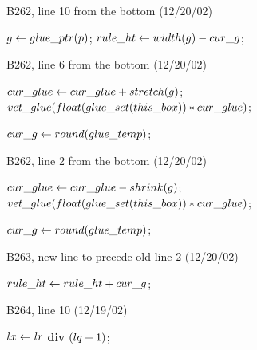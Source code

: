 {\bugonpage B262, line 10 from the bottom (12/20/02)

\ninepoint\noindent
{} $g\gets\\{glue\_ptr}(p)$;
  $\\{rule\_ht}\gets\\{width}(g)-\\{cur\_g}$;

\bugonpage B262, line 6 from the bottom (12/20/02)

\ninepoint\noindent
\qquad{} $\\{cur\_glue}\gets\\{cur\_glue}+\\{stretch}(g)$;
 $\\{vet\_glue}(\\{float}(\\{glue\_set}(\\{this\_box}))*\\{cur\_glue})$;\par
\noindent\qquad\qquad$\\{cur\_g}\gets\\{round}(\\{glue\_temp})$;

\bugonpage B262, line 2 from the bottom (12/20/02)

\ninepoint\noindent
\qquad{} $\\{cur\_glue}\gets\\{cur\_glue}-\\{shrink}(g)$;
 $\\{vet\_glue}(\\{float}(\\{glue\_set}(\\{this\_box}))*\\{cur\_glue})$;\par
\noindent\qquad\qquad$\\{cur\_g}\gets\\{round}(\\{glue\_temp})$;

\bugonpage B263, new line to precede old line 2 (12/20/02)

\ninepoint\noindent
\quad$\\{rule\_ht}\gets\\{rule\_ht}+\\{cur\_g}$;

\bugonpage B264, line 10 (12/19/02)

\ninepoint\noindent
{} $\\{lx}\gets\\{lr}$ {\bf div} $(\\{lq}+1)$;

}

